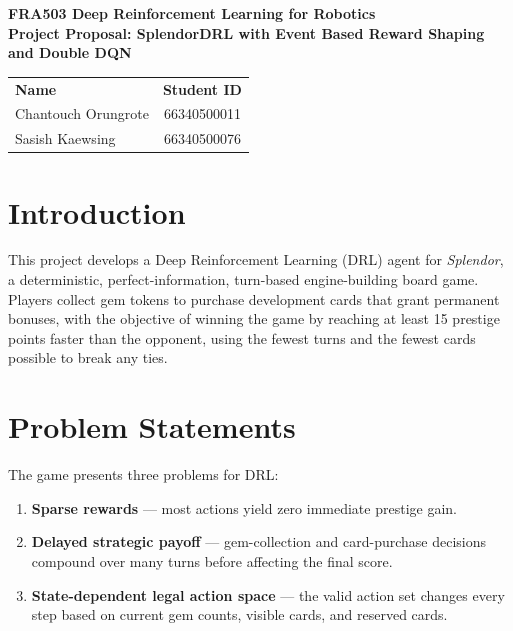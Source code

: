 \documentclass[11pt]{article}
\begin{document}

\begin{flushleft}
  {\Large\bfseries FRA503 Deep Reinforcement Learning for Robotics}\\[10pt]
  {\large\bfseries Project Proposal: SplendorDRL with Event Based Reward Shaping and Double DQN}\\[10pt]
\end{flushleft}

\vspace{8pt}
\headrule
\vspace{10pt}

\begin{tabular}{@{}lc@{}}
\textbf{Name} & \textbf{Student ID} \\[4pt]
Chantouch Orungrote & 66340500011 \\[2pt]
Sasish Kaewsing     & 66340500076
\end{tabular}

\section{Introduction}

This project develops a Deep Reinforcement Learning (DRL) agent for \textit{Splendor}, a
deterministic, perfect-information, turn-based engine-building board game. Players collect
gem tokens to purchase development cards that grant permanent bonuses, with the objective
of winning the game by reaching at least 15 prestige points faster than the opponent, using the fewest turns and the fewest cards possible to break any ties. 

\section{Problem Statements}
The game presents three problems for DRL:

\begin{enumerate}
  \item \textbf{Sparse rewards} — most actions yield zero immediate prestige gain.
  \item \textbf{Delayed strategic payoff} — gem-collection and card-purchase decisions
        compound over many turns before affecting the final score.
  \item \textbf{State-dependent legal action space} — the valid action set changes every
        step based on current gem counts, visible cards, and reserved cards.
\end{enumerate}
\end{document}
